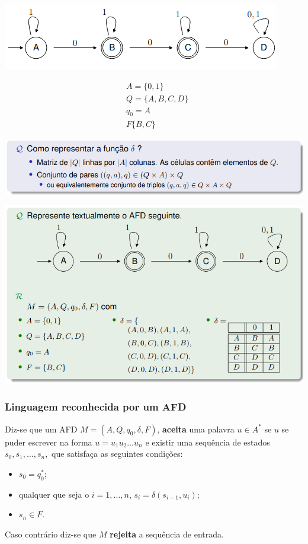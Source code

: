 \documentclass{article}
\begin{document}
\begin{center}
  \includegraphics[scale=0.5]{33}
\end{center}

\begin{align*}
  & A = \{0,1\}\\
  & Q = \{A, B, C, D\}\\
  & q_0 = A\\
  & F \{B, C\}
\end{align*}


\begin{center}
  \includegraphics[scale=0.4]{34}
\end{center}

\pagebreak

\begin{center}
  \includegraphics[scale=0.4]{35}
\end{center}

\subsubsection{Linguagem reconhecida por um AFD}

Diz-se que um AFD $M = (A, Q, q_0, \delta, F)$, \textbf{aceita} uma palavra $u \in A^*$
se $u$ se puder escrever na forma $u = u_1u_2 \dots u_n$ e existir uma sequência de estados
$s_0,s_1, \dots, s_n,$ que satisfaça as seguintes condições:
\begin{itemize}
  \item $s_0 = q_0^*$;
  \item qualquer que seja o $i = 1, \dots, n$, $s_i = \delta (s_{i-1}, u_i)$;
  \item $s_n \in F$.
\end{itemize} 
Caso contrário diz-se que $M$ \textbf{rejeita} a sequência de entrada.
\end{document}
